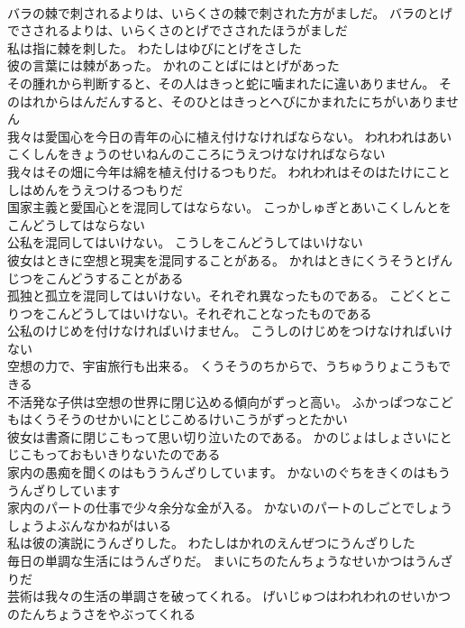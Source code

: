 \documentclass[8pt]{extreport}
\begin{document}
\begin{CJK}{UTF8}{min}
\\	バラの棘で刺されるよりは、いらくさの棘で刺された方がましだ。	バラのとげでさされるよりは、いらくさのとげでさされたほうがましだ 
\\	私は指に棘を刺した。	わたしはゆびにとげをさした 
\\	彼の言葉には棘があった。	かれのことばにはとげがあった 
\\	その腫れから判断すると、その人はきっと蛇に噛まれたに違いありません。	そのはれからはんだんすると、そのひとはきっとへびにかまれたにちがいありません 
\\	我々は愛国心を今日の青年の心に植え付けなければならない。	われわれはあいこくしんをきょうのせいねんのこころにうえつけなければならない 
\\	我々はその畑に今年は綿を植え付けるつもりだ。	われわれはそのはたけにことしはめんをうえつけるつもりだ 
\\	国家主義と愛国心とを混同してはならない。	こっかしゅぎとあいこくしんとをこんどうしてはならない 
\\	公私を混同してはいけない。	こうしをこんどうしてはいけない 
\\	彼女はときに空想と現実を混同することがある。	かれはときにくうそうとげんじつをこんどうすることがある 
\\	孤独と孤立を混同してはいけない。それぞれ異なったものである。	こどくとこりつをこんどうしてはいけない。それぞれことなったものである 
\\	公私のけじめを付けなければいけません。	こうしのけじめをつけなければいけない 
\\	空想の力で、宇宙旅行も出来る。	くうそうのちからで、うちゅうりょこうもできる 
\\	不活発な子供は空想の世界に閉じ込める傾向がずっと高い。	ふかっぱつなこどもはくうそうのせかいにとじこめるけいこうがずっとたかい 
\\	彼女は書斎に閉じこもって思い切り泣いたのである。	かのじょはしょさいにとじこもっておもいきりないたのである 
\\	家内の愚痴を聞くのはもううんざりしています。	かないのぐちをきくのはもううんざりしています 
\\	家内のパートの仕事で少々余分な金が入る。	かないのパートのしごとでしょうしょうよぶんなかねがはいる 
\\	私は彼の演説にうんざりした。	わたしはかれのえんぜつにうんざりした 
\\	毎日の単調な生活にはうんざりだ。	まいにちのたんちょうなせいかつはうんざりだ 
\\	芸術は我々の生活の単調さを破ってくれる。	げいじゅつはわれわれのせいかつのたんちょうさをやぶってくれる 

\end{CJK}
\end{document}
